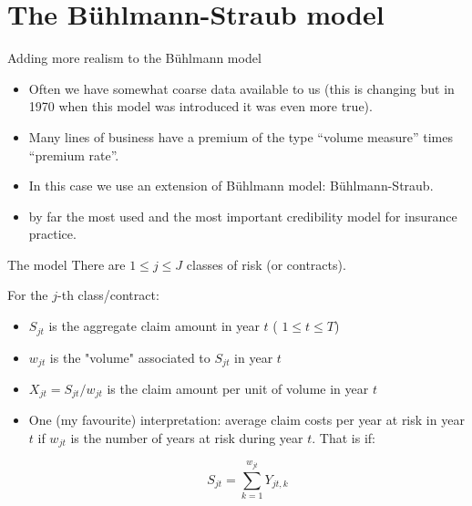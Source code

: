 \documentclass[11pt]{beamer}
\begin{document}
\section{The B{\"u}hlmann-Straub model}
\begin{frame}{Adding more realism to the B{\"u}hlmann model}

\begin{itemize}
\item Often we have somewhat coarse data available to us (this is changing but in 1970 when this model was introduced it was even more true).

\vfill

\item Many lines of business have a premium of the type ``volume measure'' times ``premium rate''.

\vfill

\item In this case we use an extension of B{\"u}hlmann model: B{\"u}hlmann-Straub.

\vfill

\item by far the most used and the most important credibility model for insurance practice.
\end{itemize}

\end{frame}
\begin{frame}{The model}
There are $1\le j \le J$ classes of risk (or contracts).

For the $j$-th class/contract:
\begin{itemize}
\item $S_{jt}$ is the aggregate claim amount in year $t$ ( $1\le t \le T$)

\vfill

\item $w_{jt}$ is the "volume" associated to $S_{jt}$ in year $t$

\vfill

\item $X_{jt}=S_{jt}/w_{jt}$ is the claim amount per unit of volume in year $t$

\vfill

\item One (my favourite) interpretation: average claim costs per year at risk in year $t$ if $w_{jt}$ is the number of years at risk during year $t$. That is if:

$$ S_{jt} = \sum_{k=1}^{w_{jt}} Y_{jt,k} $$

\end{itemize}

\end{frame}
\end{document}
